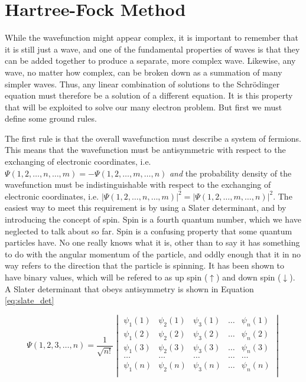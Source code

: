 \section{Hartree-Fock Method}
\label{sec:hartree_fock}
While the wavefunction might appear complex, it is important to remember that it is still just a wave, and one of the fundamental properties of waves is that they can be added together to produce a separate, more complex wave. Likewise, any wave, no matter how complex, can be broken down as a summation of many simpler waves\cite{fourier1822thorie}. Thus, any linear combination of solutions to the Schr\"{o}dinger equation must therefore be a solution of a different equation. It is this property that will be exploited to solve our many electron problem. But first we must define some ground rules.

The first rule is that the overall wavefunction must describe a system of fermions. This means that the wavefunction must be antisymmetric with respect to the exchanging of electronic coordinates, i.e. $\Psi(1, 2,\ldots, n,\ldots,m) = -\Psi(1, 2,\ldots, m,\ldots,n)$ \textit{and} the probability density of the wavefunction must be indistinguishable with respect to the exchanging of electronic coordinates, i.e. $|\Psi(1, 2,\ldots, n,\ldots,m)|^{2} = |\Psi(1, 2,\ldots, m,\ldots,n)|^{2}$. The easiest way to meet this requirement is by using a Slater determinant\cite{PhysRev.34.1293}, and by introducing the concept of spin. Spin is a fourth quantum number, which we have neglected to talk about so far. Spin is a confusing property that some quantum particles have. No one really knows what it is, other than to say it has something to do with the angular momentum of the particle, and oddly enough that it in no way refers to the direction that the particle is spinning. It has been shown to have binary values\cite{Gerlach1922}, which will be refered to as up spin ($\uparrow$) and down spin ($\downarrow$). A Slater determinant that obeys antisymmetry is shown in Equation \ref{eq:slate_det}

\begin{equation}
\label{eq:slate_det}
\Psi(1, 2, 3, \ldots, n) =
\frac{1}{\sqrt{n!}}
\begin{vmatrix}
\psi_{1}(1)		&	\psi_{2}(1)		&	\psi_{3}(1)		&	\ldots	&	\psi_{n}(1)		\\
\psi_{1}(2)		&	\psi_{2}(2)		&	\psi_{3}(2)		&	\ldots	&	\psi_{n}(2)		\\
\psi_{1}(3)		&	\psi_{2}(3)		&	\psi_{3}(3)		&	\ldots	&	\psi_{n}(3)		\\
\ldots		&	\ldots		&	\ldots		&	\ldots	&	\ldots		\\
\psi_{1}(n)		&	\psi_{2}(n)		&	\psi_{3}(n)		&	\ldots	&	\psi_{n}(n)		\\

\end{vmatrix}
\end{equation} 

